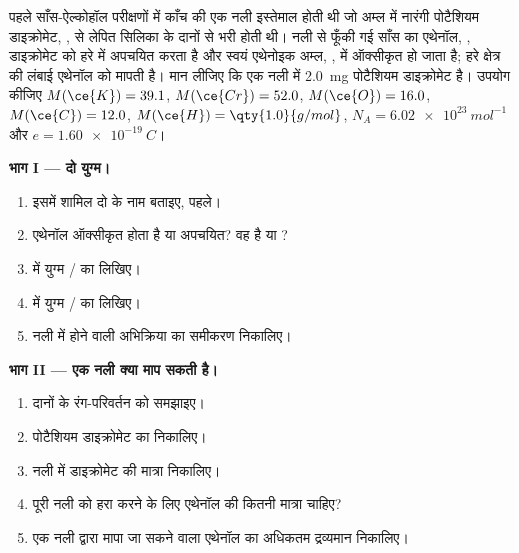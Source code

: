 \begin{problem}
\label{pb:g11:redox:1}
पहले साँस-ऐल्कोहॉल परीक्षणों में काँच की एक नली इस्तेमाल होती थी जो अम्ल में
नारंगी पोटैशियम डाइक्रोमेट, , से लेपित सिलिका के दानों से भरी होती थी।
नली से फूँकी गई साँस का एथेनॉल, ,
डाइक्रोमेट  को हरे   में अपचयित करता है और स्वयं एथेनोइक
अम्ल, , में ऑक्सीकृत हो जाता है; हरे क्षेत्र की लंबाई एथेनॉल को मापती है।
मान लीजिए कि एक नली में \qty{2.0}{mg} पोटैशियम डाइक्रोमेट है। उपयोग कीजिए
$M(\ce{K}) = 39.1$, $M(\ce{Cr}) = 52.0$, $M(\ce{O}) = 16.0$,
$M(\ce{C}) = 12.0$, $M(\ce{H}) = \qty{1.0}{g/mol}$, $N_A =
\qty{6.02e23}{mol^{-1}}$ और $e = \qty{1.60e-19}{C}$।

\medskip
\noindent\textbf{भाग I --- दो युग्म।}
\begin{enumerate}
  \item इसमें शामिल दो  के नाम बताइए,  पहले।
  \item एथेनॉल ऑक्सीकृत होता है या अपचयित? वह  है या
        ?
  \item {} में युग्म
        / का  लिखिए।
  \item {} में युग्म
        / का  लिखिए।
  \item नली में होने वाली अभिक्रिया का समीकरण निकालिए।
\end{enumerate}

\medskip
\noindent\textbf{भाग II --- एक नली क्या माप सकती है।}
\begin{enumerate}[resume]
  \item दानों के रंग-परिवर्तन को समझाइए।
  \item पोटैशियम डाइक्रोमेट का  निकालिए।
  \item नली में डाइक्रोमेट  की मात्रा निकालिए।
  \item पूरी नली को हरा करने के लिए एथेनॉल की कितनी मात्रा चाहिए?
  \item एक नली द्वारा मापा जा सकने वाला एथेनॉल का अधिकतम द्रव्यमान निकालिए।
\end{enumerate}


\end{problem}
